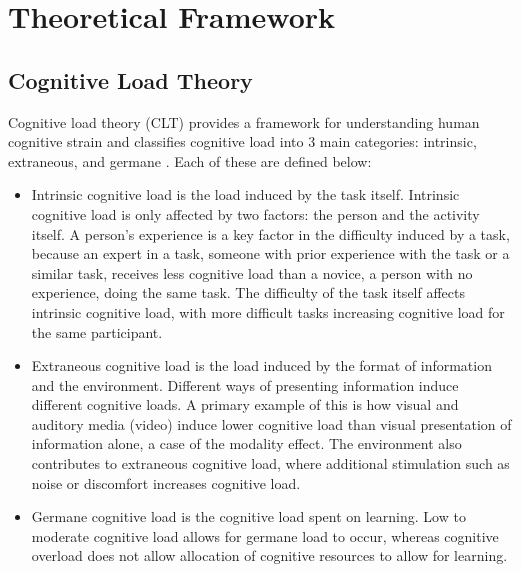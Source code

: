 \chapter{Theoretical Framework} 

\section{Cognitive Load Theory}
Cognitive load theory (CLT) provides a framework for understanding human cognitive strain and classifies cognitive load into 3 main categories: intrinsic, extraneous, and germane \cite{sweller2019architecture}. Each of these are defined below:
\begin{itemize}
    \item Intrinsic cognitive load is the load induced by the task itself. Intrinsic cognitive load is only affected by two factors: the person and the activity itself. A person’s experience is a key factor in the difficulty induced by a task, because an expert in a task, someone with prior experience with the task or a similar task, receives less cognitive load than a novice, a person with no experience, doing the same task. The difficulty of the task itself affects intrinsic cognitive load, with more difficult tasks increasing cognitive load for the same participant.
\end{itemize}
\begin{itemize}
    \item Extraneous cognitive load is the load induced by the format of information and the environment. Different ways of presenting information induce different cognitive loads. A primary example of this is how visual and auditory media (video) induce lower cognitive load than visual presentation of information alone, a case of the modality effect. The environment also contributes to extraneous cognitive load, where additional stimulation such as noise or discomfort increases cognitive load.
\end{itemize}
\begin{itemize}
    \item Germane cognitive load is the cognitive load spent on learning. Low to moderate cognitive load allows for germane load to occur, whereas cognitive overload does not allow allocation of cognitive resources to allow for learning.
\end{itemize}
